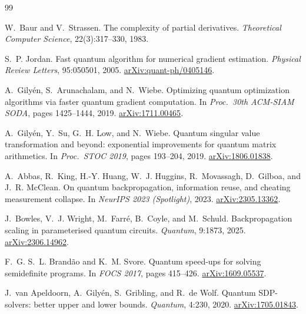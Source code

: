 \documentclass[11pt,a4paper]{article}
\theoremstyle{definition}
\begin{document}

\begin{thebibliography}{99}

W.~Baur and V.~Strassen.
\newblock The complexity of partial derivatives.
\newblock \emph{Theoretical Computer Science}, 22(3):317--330, 1983.

S.~P. Jordan.
\newblock Fast quantum algorithm for numerical gradient estimation.
\newblock \emph{Physical Review Letters}, 95:050501, 2005.
\newblock \href{https://arxiv.org/abs/quant-ph/0405146}{arXiv:quant-ph/0405146}.

A.~Gily\'{e}n, S.~Arunachalam, and N.~Wiebe.
\newblock Optimizing quantum optimization algorithms via faster quantum gradient computation.
\newblock In \emph{Proc.\ 30th ACM-SIAM SODA}, pages 1425--1444, 2019.
\newblock \href{https://arxiv.org/abs/1711.00465}{arXiv:1711.00465}.

A.~Gily\'{e}n, Y.~Su, G.~H. Low, and N.~Wiebe.
\newblock Quantum singular value transformation and beyond: exponential improvements for quantum matrix arithmetics.
\newblock In \emph{Proc.\ STOC 2019}, pages 193--204, 2019.
\newblock \href{https://arxiv.org/abs/1806.01838}{arXiv:1806.01838}.

A.~Abbas, R.~King, H.-Y. Huang, W.~J. Huggins, R.~Movassagh, D.~Gilboa, and J.~R. McClean.
\newblock On quantum backpropagation, information reuse, and cheating measurement collapse.
\newblock In \emph{NeurIPS 2023 (Spotlight)}, 2023.
\newblock \href{https://arxiv.org/abs/2305.13362}{arXiv:2305.13362}.

J.~Bowles, V.~J. Wright, M.~Farr\'{e}, B.~Coyle, and M.~Schuld.
\newblock Backpropagation scaling in parameterised quantum circuits.
\newblock \emph{Quantum}, 9:1873, 2025.
\newblock \href{https://arxiv.org/abs/2306.14962}{arXiv:2306.14962}.

F.~G. S.~L. Brand\~ao and K.~M. Svore.
\newblock Quantum speed-ups for solving semidefinite programs.
\newblock In \emph{FOCS 2017}, pages 415--426.
\newblock \href{https://arxiv.org/abs/1609.05537}{arXiv:1609.05537}.

J.~van Apeldoorn, A.~Gily\'{e}n, S.~Gribling, and R.~de Wolf.
\newblock Quantum SDP-solvers: better upper and lower bounds.
\newblock \emph{Quantum}, 4:230, 2020.
\newblock \href{https://arxiv.org/abs/1705.01843}{arXiv:1705.01843}.


\end{thebibliography}
\end{document}
